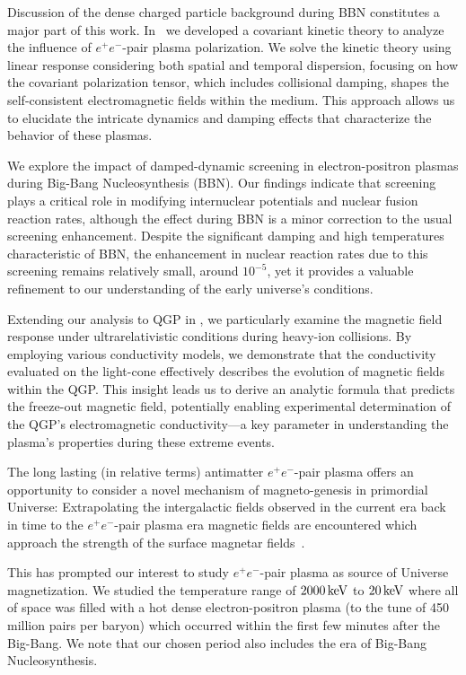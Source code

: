 Discussion of the dense charged particle background during BBN constitutes a major part of this work. In~ we developed a covariant kinetic theory to analyze the influence of $e^+e^-$-pair plasma polarization. We solve the kinetic theory using linear response considering both spatial and temporal dispersion, focusing on how the covariant polarization tensor, which includes collisional damping, shapes the self-consistent electromagnetic fields within the medium. This approach allows us to elucidate the intricate dynamics and damping effects that characterize the behavior of these plasmas.

We explore the impact of damped-dynamic screening in electron-positron plasmas during Big-Bang Nucleosynthesis (BBN). Our findings indicate that screening plays a critical role in modifying internuclear potentials and nuclear fusion reaction rates, although the effect during BBN is a minor correction to the usual screening enhancement. Despite the significant damping and high temperatures characteristic of BBN, the enhancement in nuclear reaction rates due to this screening remains relatively small, around $10^{-5}$, yet it provides a valuable refinement to our understanding of the early universe's conditions.

Extending our analysis to QGP in , we particularly examine the magnetic field response under ultrarelativistic conditions during heavy-ion collisions. By employing various conductivity models, we demonstrate that the conductivity evaluated on the light-cone effectively describes the evolution of magnetic fields within the QGP. This insight leads us to derive an analytic formula that predicts the freeze-out magnetic field, potentially enabling experimental determination of the QGP's electromagnetic conductivity—a key parameter in understanding the plasma's properties during these extreme events.


The long lasting (in relative terms) antimatter $e^+e^-$-pair  plasma offers an opportunity to consider a novel mechanism of magneto-genesis in primordial Universe: Extrapolating the intergalactic fields observed in the current era back in time to the $e^+e^-$-pair plasma era magnetic fields are encountered which approach the strength of the surface magnetar fields~.  

This has prompted our interest to study $e^+e^-$-pair plasma as source of Universe magnetization. We studied the temperature range of $2000\text{\,keV}$ to $20\text{\,keV}$ where all of space was filled with a hot dense electron-positron plasma (to the tune of 450 million pairs per baryon) which occurred within the first few minutes after the Big-Bang. We note that our chosen period also includes the era of Big-Bang Nucleosynthesis.

